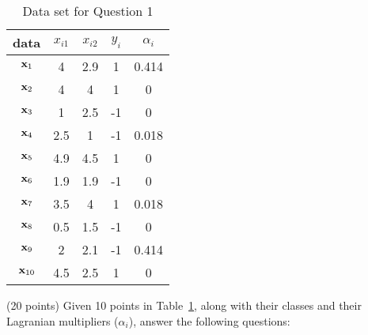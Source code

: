 \documentclass{exam}
\newcommand{\xx}{{\bf{x}}}
\begin{document}
\begin{questions}

\begin{table}[h]
	\centering
	\caption{Data set for Question 1}\label{data-q1}
	\begin{tabular}{c|c|c|c|c}
		\hline
		data & $x_{i1}$ & $x_{i2}$ & $y_i$ & $\alpha_i$\\
			\hline
		$\xx_1$ & 4 & 2.9 & 1 & 0.414 \\
			$\xx_2$ & 4 &4 & 1 & 0 \\
				$\xx_3$ & 1 & 2.5 & -1 & 0\\
					$\xx_4$ & 2.5 & 1& -1 & 0.018 \\
						$\xx_5$ & 4.9 & 4.5& 1 & 0 \\
							$\xx_6$ & 1.9 & 1.9 & -1 & 0\\
								$\xx_7$ &3.5 & 4 & 1 & 0.018 \\
									$\xx_8$ & 0.5 & 1.5 & -1 & 0 \\
										$\xx_9$ & 2 & 2.1 & -1 & 0.414 \\
											$\xx_{10}$ & 4.5& 2.5& 1 & 0\\
			\hline
\end{tabular}
\end{table}
\label{q1} (20 points) Given 10 points in Table~\ref{data-q1}, along with their classes and their Lagranian multipliers ($\alpha_i$), answer the following questions:




\end{questions}
\end{document}
